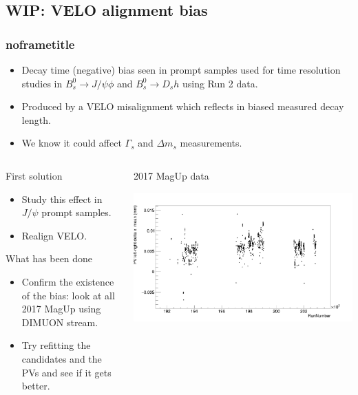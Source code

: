 \documentclass[aspectratio=169,9pt,handout]{beamer}
\begin{document}
\subsection{{\color{red} WIP:} VELO alignment bias}
\begin{frame}[default] %
\frametitle{noframetitle}
\begin{itemize}
  \item Decay time (negative) bias seen in prompt samples used for time resolution studies in $B_s^0 \rightarrow J/\psi \phi$ and $B_s^0 \rightarrow D_s h$ using Run 2 data.
  \item Produced by a VELO misalignment which reflects in biased measured decay length.
  \item We know it could affect $\Gamma_s$ and $\Delta m_s$ measurements. 
\end{itemize}

\begin{columns}%
  \begin{column}{0.475\textwidth}
    \begin{block}{First solution}
      \begin{itemize}
      \item Study this effect in $J/\psi$ prompt samples.
      \item Realign VELO.
      \end{itemize}
    \end{block}
    \begin{block}{What has been done}
      \begin{itemize}
      \item Confirm the existence of the bias: look at all 2017 MagUp using DIMUON stream.
      \item Try refitting the candidates and the PVs and see if it gets better. 
    \end{itemize}
    \end{block}
  \end{column}
  \begin{column}{0.475\textwidth}
    \begin{center}
      \footnotesize 2017 MagUp data \vspace*{-2mm}
    \end{center}
    \includegraphics[width=\textwidth]{gpx/JpsiPhiBiasTitles.png}
  \end{column}
\end{columns}


\end{frame}
\end{document}
